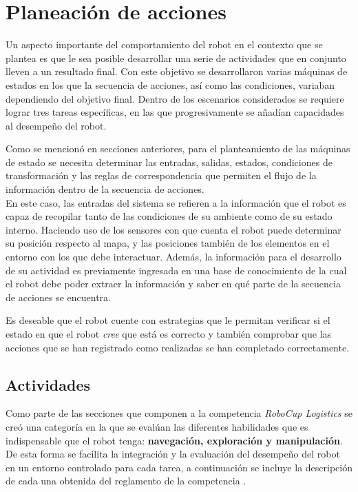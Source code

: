 \chapter{Planeación de acciones}
Un aspecto importante del comportamiento del robot en el contexto que se plantea es que le sea posible desarrollar una serie de actividades que en conjunto lleven a un resultado final.
Con este objetivo se desarrollaron varias máquinas de estados en los que la secuencia de acciones, así como las condiciones, variaban dependiendo del objetivo final. 
Dentro de los escenarios considerados se requiere lograr tres tareas específicas, en las que progresivamente se añadían capacidades al desempeño del robot.

Como se mencionó en secciones anteriores, para el planteamiento de las máquinas de estado se necesita determinar las entradas, salidas, estados,  condiciones de transformación y las reglas de correspondencia que permiten el flujo de la información dentro de la secuencia de acciones.\\
En este caso, las entradas del sistema se refieren a la información que el robot es capaz de recopilar tanto de las condiciones de su ambiente como de su estado interno.
Haciendo uso de los sensores con que cuenta el robot puede determinar su posición respecto al mapa, y las posiciones también de los elementos en el entorno con los que debe interactuar.
Además, la información para el desarrollo de su actividad es previamente ingresada en una base de conocimiento de la cual el robot debe poder extraer la información y saber en qué parte de la secuencia de acciones se encuentra.

Es deseable que el robot cuente con estrategias que le permitan verificar si el estado en que el robot \textit{cree} que está es correcto y también comprobar que las acciones que se han registrado como realizadas se han completado correctamente.

\section{Actividades}

Como parte de las secciones que componen a la competencia \textit{RoboCup Logistics} se creó una categoría en la que se evalúan las diferentes habilidades que es indispensable que el robot tenga: \textbf{navegación, exploración y manipulación}. De esta forma se facilita la integración y la evaluación del desempeño del robot en un entorno controlado para cada tarea, a continuación se incluye la descripción de cada una obtenida del reglamento de la competencia \cite{technical_committee_20122022_robocup_2022}.

